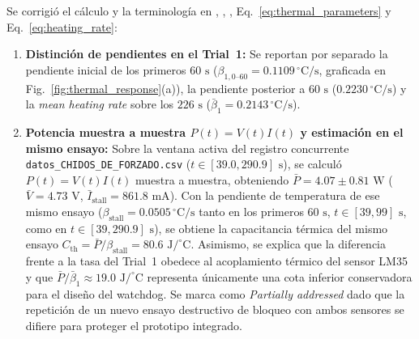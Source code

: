 \documentclass{LabDSTresponse}
\begin{document}
{Se corrigió el cálculo y la terminología en , , , Eq.~\eqref{eq:thermal_parameters} y Eq.~\eqref{eq:heating_rate}:
\begin{enumerate}
    \item \textbf{Distinción de pendientes en el Trial~1:} Se reportan por separado la pendiente inicial de los primeros $60\text{ s}$ ($\beta_{1,0\text{--}60} = 0.1109\,^\circ\text{C/s}$, graficada en Fig.~\ref{fig:thermal_response}(a)), la pendiente posterior a $60\text{ s}$ ($0.2230\,^\circ\text{C/s}$) y la \textit{mean heating rate} sobre los $226\text{ s}$ ($\bar{\beta}_1 = 0.2143\,^\circ\text{C/s}$).
    \item \textbf{Potencia muestra a muestra $P(t)=V(t)I(t)$ y estimación en el mismo ensayo:} Sobre la ventana activa del registro concurrente \texttt{datos\_CHIDOS\_DE\_FORZADO.csv} ($t \in [39.0, 290.9]\text{ s}$), se calculó $P(t) = V(t)I(t)$ muestra a muestra, obteniendo $\bar{P} = 4.07 \pm 0.81\text{ W}$ ($\bar{V} = 4.73\text{ V}$, $\bar{I}_{\text{stall}} = 861.8\text{ mA}$). Con la pendiente de temperatura de ese mismo ensayo ($\beta_{\text{stall}} = 0.0505\,^\circ\text{C/s}$ tanto en los primeros $60\text{ s}$, $t \in [39, 99]\text{ s}$, como en $t \in [39, 290.9]\text{ s}$), se obtiene la capacitancia térmica del mismo ensayo $C_{\text{th}} = \bar{P}/\beta_{\text{stall}} = 80.6\text{ J/}^\circ\text{C}$. Asimismo, se explica que la diferencia frente a la tasa del Trial~1 obedece al acoplamiento térmico del sensor LM35 y que $\bar{P}/\bar{\beta}_1 \approx 19.0\text{ J/}^\circ\text{C}$ representa únicamente una cota inferior conservadora para el diseño del watchdog. Se marca como \textit{Partially addressed} dado que la repetición de un nuevo ensayo destructivo de bloqueo con ambos sensores se difiere para proteger el prototipo integrado.
\end{enumerate}}
\end{document}
